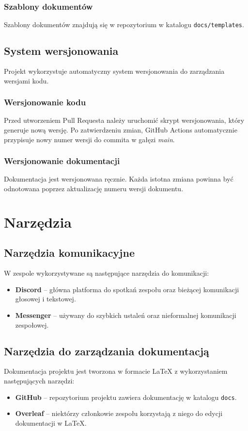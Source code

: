 \documentclass[12pt,a4paper,colorlinks=true,linkcolor=NavyBlue,citecolor=red,urlcolor=NavyBlue]{book}
\begin{document}
\subsection{Szablony dokumentów}
Szablony dokumentów znajdują się w repozytorium w katalogu \texttt{docs/templates}. 

\section{System wersjonowania}
Projekt wykorzystuje automatyczny system wersjonowania do zarządzania wersjami kodu.

\subsection{Wersjonowanie kodu}
Przed utworzeniem Pull Requesta należy uruchomić skrypt wersjonowania, który generuje nową wersję. Po zatwierdzeniu zmian, GitHub Actions automatycznie przypisuje nowy numer wersji do commita w gałęzi \textit{main}.  

\subsection{Wersjonowanie dokumentacji}
Dokumentacja jest wersjonowana ręcznie. Każda istotna zmiana powinna być odnotowana poprzez aktualizację numeru wersji dokumentu.

\chapter{Narzędzia}

\section{Narzędzia komunikacyjne}  
W zespole wykorzystywane są następujące narzędzia do komunikacji:  
\begin{itemize}  
    \item \textbf{Discord} – główna platforma do spotkań zespołu oraz bieżącej komunikacji głosowej i tekstowej.  
    \item \textbf{Messenger} – używany do szybkich ustaleń oraz nieformalnej komunikacji zespołowej.  
\end{itemize}  

\section{Narzędzia do zarządzania dokumentacją}  
Dokumentacja projektu jest tworzona w formacie \LaTeX{} z wykorzystaniem następujących narzędzi:  
\begin{itemize}  
    \item \textbf{GitHub} – repozytorium projektu zawiera dokumentację w katalogu \texttt{docs}.  
    \item \textbf{Overleaf} – niektórzy członkowie zespołu korzystają z niego do edycji dokumentacji w \LaTeX{}.  
\end{itemize}  
\end{document}
